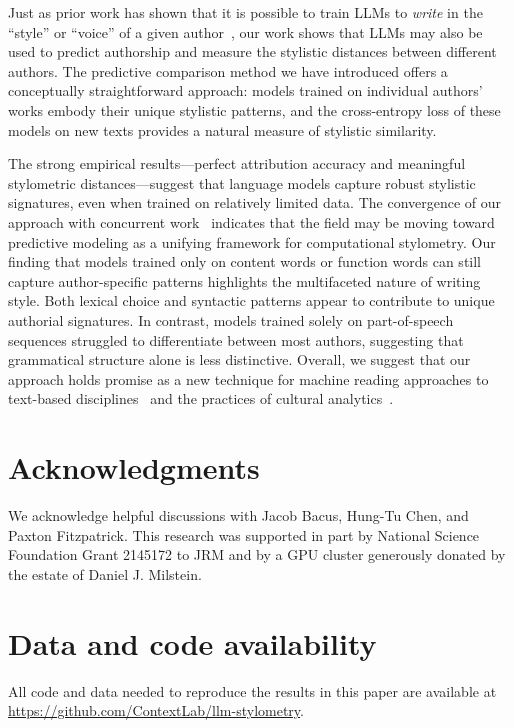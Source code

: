 \documentclass[11pt]{article}
\begin{document}
Just as prior work has shown that it is possible to train LLMs to
\textit{write} in the ``style'' or ``voice'' of a given author~\citep[see
e.g.,][]{Mikr25}, our work shows that LLMs may also be used to predict
authorship and measure the stylistic distances between different authors. The
predictive comparison method we have introduced offers a conceptually
straightforward approach: models trained on individual authors' works embody
their unique stylistic patterns, and the cross-entropy loss of these models on
new texts provides a natural measure of stylistic similarity.

The strong empirical results---perfect attribution accuracy and meaningful
stylometric distances---suggest that language models capture robust stylistic
signatures, even when trained on relatively limited data. The convergence of
our approach with concurrent work~\citep{HuanEtal25,Reza25} indicates that the
field may be moving toward predictive modeling as a unifying framework for
computational stylometry. Our finding that models trained only on content words
or function words can still capture author-specific patterns highlights the
multifaceted nature of writing style. Both lexical choice and syntactic
patterns appear to contribute to unique authorial signatures. In contrast,
models trained solely on part-of-speech sequences struggled to differentiate
between most authors, suggesting that grammatical structure alone is less
distinctive. Overall, we suggest that our approach holds promise as a new
technique for machine reading approaches to text-based
disciplines~\citep{More17,More00,Holm98} and the practices of cultural
analytics~\citep{UndeEtal13}.

\section*{Acknowledgments}

We acknowledge helpful discussions with Jacob Bacus, Hung-Tu Chen, and Paxton
Fitzpatrick. This research was supported in part by National Science Foundation
Grant 2145172 to JRM and by a GPU cluster generously donated by the estate of
Daniel J. Milstein.

\section*{Data and code availability}

All code and data needed to reproduce the results in this paper are available
at \url{https://github.com/ContextLab/llm-stylometry}.
\end{document}
